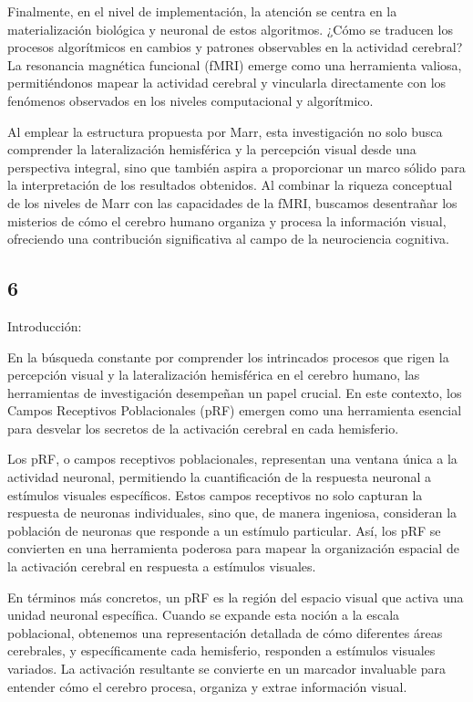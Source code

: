 \documentclass[12pt,oneside]{uhthesis}
\begin{document}
Finalmente, en el nivel de implementación, la atención se centra en la materialización biológica y neuronal de estos algoritmos. ¿Cómo se traducen los procesos algorítmicos en cambios y patrones observables en la actividad cerebral? La resonancia magnética funcional (fMRI) emerge como una herramienta valiosa, permitiéndonos mapear la actividad cerebral y vincularla directamente con los fenómenos observados en los niveles computacional y algorítmico.

Al emplear la estructura propuesta por Marr, esta investigación no solo busca comprender la lateralización hemisférica y la percepción visual desde una perspectiva integral, sino que también aspira a proporcionar un marco sólido para la interpretación de los resultados obtenidos. Al combinar la riqueza conceptual de los niveles de Marr con las capacidades de la fMRI, buscamos desentrañar los misterios de cómo el cerebro humano organiza y procesa la información visual, ofreciendo una contribución significativa al campo de la neurociencia cognitiva.

\subsection{6}

Introducción:

En la búsqueda constante por comprender los intrincados procesos que rigen la percepción visual y la lateralización hemisférica en el cerebro humano, las herramientas de investigación desempeñan un papel crucial. En este contexto, los Campos Receptivos Poblacionales (pRF) emergen como una herramienta esencial para desvelar los secretos de la activación cerebral en cada hemisferio.

Los pRF, o campos receptivos poblacionales, representan una ventana única a la actividad neuronal, permitiendo la cuantificación de la respuesta neuronal a estímulos visuales específicos. Estos campos receptivos no solo capturan la respuesta de neuronas individuales, sino que, de manera ingeniosa, consideran la población de neuronas que responde a un estímulo particular. Así, los pRF se convierten en una herramienta poderosa para mapear la organización espacial de la activación cerebral en respuesta a estímulos visuales.

En términos más concretos, un pRF es la región del espacio visual que activa una unidad neuronal específica. Cuando se expande esta noción a la escala poblacional, obtenemos una representación detallada de cómo diferentes áreas cerebrales, y específicamente cada hemisferio, responden a estímulos visuales variados. La activación resultante se convierte en un marcador invaluable para entender cómo el cerebro procesa, organiza y extrae información visual.
\end{document}
